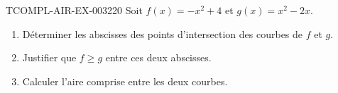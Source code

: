 \begin{exercice}{TCOMPL-AIR-EX-003}{2}{20}
Soit $f(x) = -x^2+4$ et $g(x) = x^2-2x$.
\begin{enumerate}
  \item Déterminer les abscisses des points d'intersection des courbes de $f$ et $g$.
  \item Justifier que $f \geq g$ entre ces deux abscisses.
  \item Calculer l'aire comprise entre les deux courbes.
\end{enumerate}
\end{exercice}
